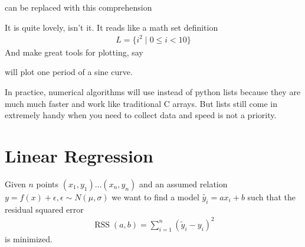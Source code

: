 \documentclass[letterpaper,10pt,english]{jupyterBook}
\begin{document}
\sphinxAtStartPar
can be replaced with this comprehension

\begin{sphinxVerbatim}[commandchars=\\\{\}]
  \PYG{p}{[}    \PYG{p}{]}
\end{sphinxVerbatim}

\sphinxAtStartPar
It is quite lovely, isn’t it. It reads like a math set definition
\begin{equation*}
\begin{split} L = \{i^2 \; | \;  0 \leq i < 10\}\end{split}
\end{equation*}
\sphinxAtStartPar
And make great tools for plotting, say

\begin{sphinxVerbatim}[commandchars=\\\{\}]
   
     
  \PYG{p}{[}    \PYG{p}{]}
  \PYG{p}{[}    \PYG{p}{]}
\end{sphinxVerbatim}

\sphinxAtStartPar
will plot one period of a sine curve.

\sphinxAtStartPar
In practice, numerical algorithms will use  instead of python lists because they are much much faster and work like traditional C arrays. But lists still come in extremely handy when you need to collect data and speed is not a priority.

\sphinxstepscope


\chapter{Linear Regression}
\label{\detokenize{lessons/Linear_regression_derivation:linear-regression}}\label{\detokenize{lessons/Linear_regression_derivation::doc}}
\sphinxAtStartPar
Given \(n\) points \(\left(x_{1}, y_{1}\right) \ldots\left(x_{n}, y_{n}\right)\)
and an assumed relation \(y=f(x)+\epsilon, \epsilon \sim N(\mu, \sigma)\)
we want to find a model \(\tilde{y_i}=a x_i+b\)
such that the residual squared error
\begin{equation*}
\begin{split}
\operatorname{RSS}(a, b)=\sum_{i=1}^n \left(\tilde{y}_{i}-y_{i}\right)^{2}
\end{split}
\end{equation*}
\sphinxAtStartPar
is minimized.
\end{document}
